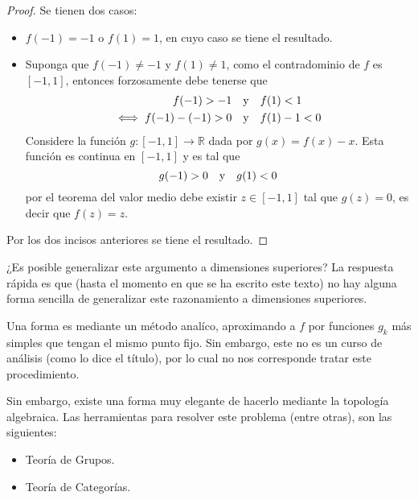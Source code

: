 \documentclass{article}
\theoremstyle{largebreak}
\newcommand\cf[3]{\ensuremath{#1:#2\rightarrow#3}}
\begin{document}
    \begin{proof}
        Se tienen dos casos:
        \begin{itemize}
            \item $f(-1)=-1$ o $f(1)=1$, en cuyo caso se tiene el resultado.
            \item Suponga que $f(-1)\neq -1$ y $f(1)\neq 1$, como el contradominio de $f$ es $[-1,1]$, entonces forzosamente debe tenerse que
            \begin{equation*}
                \begin{split}
                    f(-1)>-1\quad\textup{y}&\quad f(1)<1\\
                    \iff f(-1)-(-1)>0\quad\textup{y}&\quad f(1)-1<0\\
                \end{split}
            \end{equation*}
            Considere la función $\cf{g}{[-1,1]}{\mathbb{R}}$ dada por $g(x)=f(x)-x$. Esta función es continua en $[-1,1]$ y es tal que
            \begin{equation*}
                g(-1)>0\quad\textup{y}\quad g(1)<0
            \end{equation*}
            por el teorema del valor medio debe existir $z\in[-1,1]$ tal que $g(z)=0$, es decir que $f(z)=z$.
        \end{itemize}
        Por los dos incisos anteriores se tiene el resultado.
    \end{proof}

    ¿Es posible generalizar este argumento a dimensiones superiores? La respuesta rápida es que (hasta el momento en que se ha escrito este texto) no hay alguna forma sencilla de generalizar este razonamiento a dimensiones superiores.

    Una forma es mediante un método analíco, aproximando a $f$ por funciones $g_k$ más simples que tengan el mismo punto fijo. Sin embargo, este no es un curso de análisis (como lo dice el título), por lo cual no nos corresponde tratar este procedimiento.

    Sin embargo, existe una forma muy elegante de hacerlo mediante la topología algebraica. Las herramientas para resolver este problema (entre otras), son las siguientes:

    \begin{itemize}
        \item Teoría de Grupos.
        \item Teoría de Categorías.
    \end{itemize}
\end{document}
